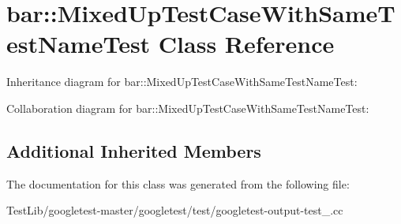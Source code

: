 \hypertarget{classbar_1_1MixedUpTestCaseWithSameTestNameTest}{}\section{bar\+:\+:Mixed\+Up\+Test\+Case\+With\+Same\+Test\+Name\+Test Class Reference}
\label{classbar_1_1MixedUpTestCaseWithSameTestNameTest}


Inheritance diagram for bar\+:\+:Mixed\+Up\+Test\+Case\+With\+Same\+Test\+Name\+Test\+:


Collaboration diagram for bar\+:\+:Mixed\+Up\+Test\+Case\+With\+Same\+Test\+Name\+Test\+:
\subsection*{Additional Inherited Members}


The documentation for this class was generated from the following file\+:\begin{DoxyCompactItemize}
\item 
Test\+Lib/googletest-\/master/googletest/test/googletest-\/output-\/test\+\_\+.\+cc\end{DoxyCompactItemize}
